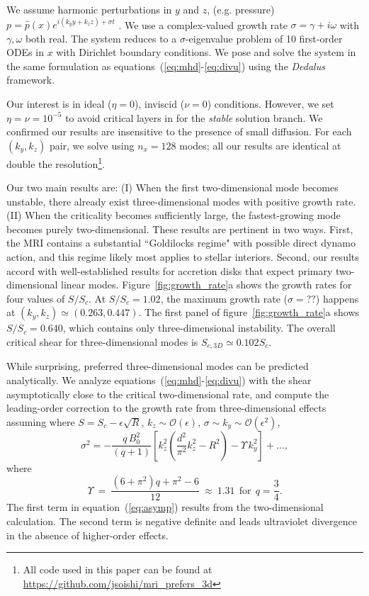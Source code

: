 \documentclass[aps,prl,reprint,superscriptaddress]{revtex4-1}
\newcommand{\SSC}{S/S_{c}}
\begin{document}
We assume harmonic perturbations in $y$ and $z$, (e.g. pressure) $p = \hat{p}(x) e^{i(k_y y + k_z z) + \sigma t}$ . 
We use a complex-valued growth rate $\sigma = \gamma + i\omega$ with $\gamma, \omega$ both real. 
The system reduces to a $\sigma$-eigenvalue problem of 10 first-order ODEs in $x$ with Dirichlet boundary conditions.
We pose and solve the system in the same formulation as equations~(\ref{eq:mhd}-\ref{eq:divu}) using the \emph{Dedalus} framework. 

Our interest is in ideal ($\eta = 0$), inviscid ($\nu = 0$) conditions.
However, we set $\eta=\nu=10^{-5}$ to avoid critical layers in for the \textit{stable} solution branch.
We confirmed our results are insensitive to the presence of small diffusion. 
For each $(k_y, k_z)$ pair, we solve using $n_x = 128$ modes; all our results are identical at double the resolution\footnote{All code used in this paper can be found at \protect\url{https://github.com/jsoishi/mri\_prefers\_3d}}.

Our two main results are: (I) When the first two-dimensional mode becomes unstable, there already exist three-dimensional modes with positive growth rate. (II) When the criticality becomes sufficiently large, the fastest-growing mode becomes purely two-dimensional. These results are pertinent in two ways. First, the MRI contains a substantial ``Goldilocks regime" with possible direct dynamo action, and this regime likely most applies to stellar interiors. Second, our results accord with well-established results for accretion disks that expect primary two-dimensional linear modes.
Figure~\ref{fig:growth_rate}a shows the growth rates for four values of $\SSC$. 
At $\SSC = 1.02$, the maximum growth rate ($\sigma = ??$) happens at $(k_y, k_z) \simeq (0.263, 0.447)$.
The first panel of figure~\ref{fig:growth_rate}a shows $\SSC = 0.640$, which contains only three-dimensional instability.
The overall critical shear for three-dimensional modes is $S_{c,3D} \simeq 0.102 S_c$.

While surprising, preferred three-dimensional modes can be predicted analytically.
We analyze equations~(\ref{eq:mhd}-\ref{eq:divu}) with the shear asymptotically close to the critical two-dimensional rate, and compute the leading-order correction to the growth rate from three-dimensional effects assuming where $S = S_c - \epsilon \sqrt{R}$, $k_{z} \sim \mathcal{O}(\epsilon)$, $\sigma \sim k_{y} \sim \mathcal{O}(\epsilon^{2})$, 
\begin{equation}
  \label{eq:asymp}
\sigma^{2} =  -\frac{q\,B_{0}^{2}}{(q+1)} \left[ k_z^2 \left( \frac{d^2}{\pi^{2}} k_z^2 - R^{2}\right)  -  \Upsilon \, k_{y}^{2}  \right] +  \ldots,
\end{equation}
where
\begin{equation}
\Upsilon \ = \ \frac{\left(6+\pi ^2\right) q+\pi^2-6}{12 }\  \approx \ 1.31 \ \  \text{for}  \ \  q = \frac{3}{4}.
\end{equation}
The first term in equation~(\ref{eq:asymp}) results from the two-dimensional calculation.
The second term is negative definite and leads ultraviolet divergence in the absence of higher-order effects.
\end{document}

